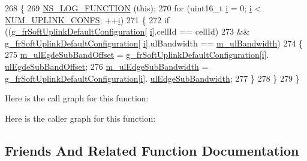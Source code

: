 \begin{DoxyCode}
268 \{
269   \hyperlink{log-macros-disabled_8h_a90b90d5bad1f39cb1b64923ea94c0761}{NS\_LOG\_FUNCTION} (\textcolor{keyword}{this});
270   \textcolor{keywordflow}{for} (uint16\_t \hyperlink{bernuolliDistribution_8m_a6f6ccfcf58b31cb6412107d9d5281426}{i} = 0; \hyperlink{bernuolliDistribution_8m_a6f6ccfcf58b31cb6412107d9d5281426}{i} < \hyperlink{namespacens3_a5dc0a36a47c74fa76aa6f2db243f9478}{NUM\_UPLINK\_CONFS}; ++\hyperlink{bernuolliDistribution_8m_a6f6ccfcf58b31cb6412107d9d5281426}{i})
271     \{
272       \textcolor{keywordflow}{if} ((\hyperlink{namespacens3_a8a93656520f0f40948463057f88a266a}{g\_frSoftUplinkDefaultConfiguration}[
      \hyperlink{bernuolliDistribution_8m_a6f6ccfcf58b31cb6412107d9d5281426}{i}].cellId == cellId)
273           && \hyperlink{namespacens3_a8a93656520f0f40948463057f88a266a}{g\_frSoftUplinkDefaultConfiguration}[
      \hyperlink{bernuolliDistribution_8m_a6f6ccfcf58b31cb6412107d9d5281426}{i}].ulBandwidth == \hyperlink{classns3_1_1LteFfrAlgorithm_acfa0105633ee5c27538c3309eb132d21}{m\_ulBandwidth})
274         \{
275           \hyperlink{classns3_1_1LteFrSoftAlgorithm_a10b3660c54a8f9f05f05708509283f11}{m\_ulEgdeSubBandOffset} = 
      \hyperlink{namespacens3_a8a93656520f0f40948463057f88a266a}{g\_frSoftUplinkDefaultConfiguration}[\hyperlink{bernuolliDistribution_8m_a6f6ccfcf58b31cb6412107d9d5281426}{i}].
      \hyperlink{structns3_1_1FrSoftUplinkDefaultConfiguration_a30c213b4f59caf0cefcecbb7528bf100}{ulEgdeSubBandOffset};
276           \hyperlink{classns3_1_1LteFrSoftAlgorithm_a32a47126b3423faab9941788f5ea78a3}{m\_ulEdgeSubBandwidth} = 
      \hyperlink{namespacens3_a8a93656520f0f40948463057f88a266a}{g\_frSoftUplinkDefaultConfiguration}[\hyperlink{bernuolliDistribution_8m_a6f6ccfcf58b31cb6412107d9d5281426}{i}].
      \hyperlink{structns3_1_1FrSoftUplinkDefaultConfiguration_a9a9a3081265e07a57ae0a8aa0c66f8d0}{ulEdgeSubBandwidth};
277         \}
278     \}
279 \}
\end{DoxyCode}


Here is the call graph for this function\+:




Here is the caller graph for this function\+:




\subsection{Friends And Related Function Documentation}
